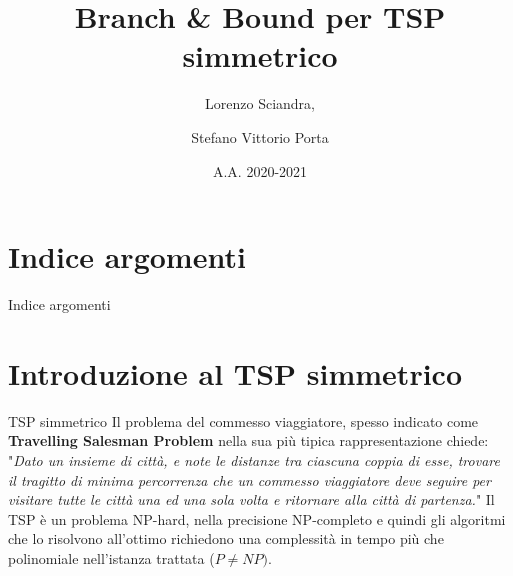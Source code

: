 \documentclass[10pt]{beamer}
\title{Branch \& Bound per TSP simmetrico}
\author{Lorenzo Sciandra, \and Stefano Vittorio Porta}
\date{A.A. 2020-2021}
\institute{Università degli Studi di Torino}
\begin{document}
\maketitle

\section{Indice argomenti}

\begin{frame}{Indice argomenti}
    \tableofcontents
\end{frame}

\section{Introduzione al TSP simmetrico}
\begin{frame}{TSP simmetrico}
    Il problema del commesso viaggiatore, spesso indicato come \textbf{Travelling Salesman Problem} nella sua più tipica rappresentazione chiede:\newline
    "\textit{Dato un insieme di città, e note le distanze tra ciascuna coppia di esse, trovare il tragitto di minima percorrenza che un commesso viaggiatore deve seguire per visitare tutte le città una ed una sola volta e ritornare alla città di partenza.}"
    \newline
    \newline
    Il TSP è un problema NP-hard, nella precisione NP-completo e quindi gli algoritmi che lo risolvono all'ottimo richiedono una complessità in tempo più che polinomiale nell'istanza trattata ($P \neq NP)$.
\end{frame}
\end{document}
